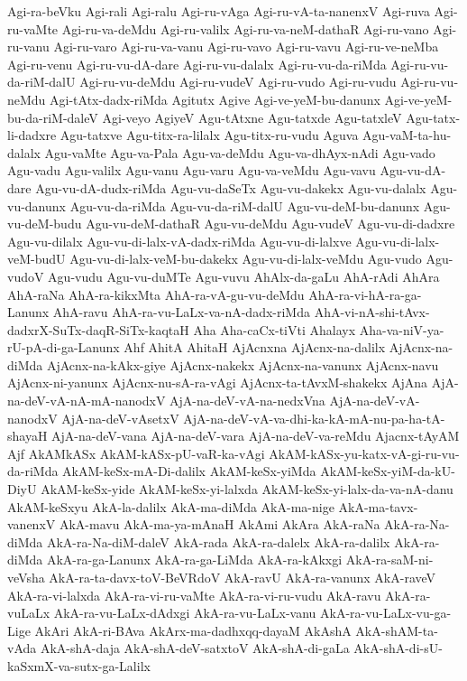 {Agi-ra-beVku
Agi-rali
Agi-ralu
Agi-ru-vAga
Agi-ru-vA-ta-nanenxV
Agi-ruva
Agi-ru-vaMte
Agi-ru-va-deMdu
Agi-ru-valilx
Agi-ru-va-neM-dathaR
Agi-ru-vano
Agi-ru-vanu
Agi-ru-varo
Agi-ru-va-vanu
Agi-ru-vavo
Agi-ru-vavu
Agi-ru-ve-neMba
Agi-ru-venu
Agi-ru-vu-dA-dare
Agi-ru-vu-dalalx
Agi-ru-vu-da-riMda
Agi-ru-vu-da-riM-dalU
Agi-ru-vu-deMdu
Agi-ru-vudeV
Agi-ru-vudo
Agi-ru-vudu
Agi-ru-vu-neMdu
Agi-tAtx-dadx-riMda
Agitutx
Agive
Agi-ve-yeM-bu-danunx
Agi-ve-yeM-bu-da-riM-daleV
Agi-veyo
AgiyeV
Agu-tAtxne
Agu-tatxde
Agu-tatxleV
Agu-tatx-li-dadxre
Agu-tatxve
Agu-titx-ra-lilalx
Agu-titx-ru-vudu
Aguva
Agu-vaM-ta-hu-dalalx
Agu-vaMte
Agu-va-Pala
Agu-va-deMdu
Agu-va-dhAyx-nAdi
Agu-vado
Agu-vadu
Agu-valilx
Agu-vanu
Agu-varu
Agu-va-veMdu
Agu-vavu
Agu-vu-dA-dare
Agu-vu-dA-dudx-riMda
Agu-vu-daSeTx
Agu-vu-dakekx
Agu-vu-dalalx
Agu-vu-danunx
Agu-vu-da-riMda
Agu-vu-da-riM-dalU
Agu-vu-deM-bu-danunx
Agu-vu-deM-budu
Agu-vu-deM-dathaR
Agu-vu-deMdu
Agu-vudeV
Agu-vu-di-dadxre
Agu-vu-dilalx
Agu-vu-di-lalx-vA-dadx-riMda
Agu-vu-di-lalxve
Agu-vu-di-lalx-veM-budU
Agu-vu-di-lalx-veM-bu-dakekx
Agu-vu-di-lalx-veMdu
Agu-vudo
Agu-vudoV
Agu-vudu
Agu-vu-duMTe
Agu-vuvu
AhAlx-da-gaLu
AhA-rAdi
AhAra
AhA-raNa
AhA-ra-kikxMta
AhA-ra-vA-gu-vu-deMdu
AhA-ra-vi-hA-ra-ga-Lanunx
AhA-ravu
AhA-ra-vu-LaLx-va-nA-dadx-riMda
AhA-vi-nA-shi-tAvx-dadxrX-SuTx-daqR-SiTx-kaqtaH
Aha
Aha-caCx-tiVti
Ahalayx
Aha-va-niV-ya-rU-pA-di-ga-Lanunx
Ahf
AhitA
AhitaH
AjAcnxna
AjAcnx-na-dalilx
AjAcnx-na-diMda
AjAcnx-na-kAkx-giye
AjAcnx-nakekx
AjAcnx-na-vanunx
AjAcnx-navu
AjAcnx-ni-yanunx
AjAcnx-nu-sA-ra-vAgi
AjAcnx-ta-tAvxM-shakekx
AjAna
AjA-na-deV-vA-nA-mA-nanodxV
AjA-na-deV-vA-na-nedxVna
AjA-na-deV-vA-nanodxV
AjA-na-deV-vAsetxV
AjA-na-deV-vA-va-dhi-ka-kA-mA-nu-pa-ha-tA-shayaH
AjA-na-deV-vana
AjA-na-deV-vara
AjA-na-deV-va-reMdu
Ajacnx-tAyAM
Ajf
AkAMkASx
AkAM-kASx-pU-vaR-ka-vAgi
AkAM-kASx-yu-katx-vA-gi-ru-vu-da-riMda
AkAM-keSx-mA-Di-dalilx
AkAM-keSx-yiMda
AkAM-keSx-yiM-da-kU-DiyU
AkAM-keSx-yide
AkAM-keSx-yi-lalxda
AkAM-keSx-yi-lalx-da-va-nA-danu
AkAM-keSxyu
AkA-la-dalilx
AkA-ma-diMda
AkA-ma-nige
AkA-ma-tavx-vanenxV
AkA-mavu
AkA-ma-ya-mAnaH
AkAmi
AkAra
AkA-raNa
AkA-ra-Na-diMda
AkA-ra-Na-diM-daleV
AkA-rada
AkA-ra-dalelx
AkA-ra-dalilx
AkA-ra-diMda
AkA-ra-ga-Lanunx
AkA-ra-ga-LiMda
AkA-ra-kAkxgi
AkA-ra-saM-ni-veVsha
AkA-ra-ta-davx-toV-BeVRdoV
AkA-ravU
AkA-ra-vanunx
AkA-raveV
AkA-ra-vi-lalxda
AkA-ra-vi-ru-vaMte
AkA-ra-vi-ru-vudu
AkA-ravu
AkA-ra-vuLaLx
AkA-ra-vu-LaLx-dAdxgi
AkA-ra-vu-LaLx-vanu
AkA-ra-vu-LaLx-vu-ga-Lige
AkAri
AkA-ri-BAva
AkArx-ma-dadhxqq-dayaM
AkAshA
AkA-shAM-ta-vAda
AkA-shA-daja
AkA-shA-deV-satxtoV
AkA-shA-di-gaLa
AkA-shA-di-sU-kaSxmX-va-sutx-ga-Lalilx
}
